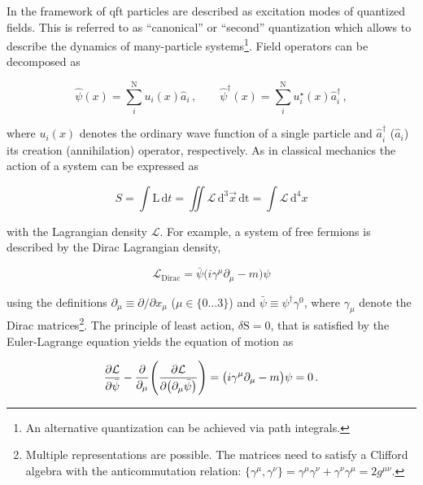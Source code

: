 In the framework of \gls{qft} particles are described as excitation modes of quantized fields. This is referred to as ``canonical'' or ``second'' quantization which allows to describe the dynamics of many-particle systems\footnote{An alternative quantization can be achieved via path integrals.}. Field operators can be decomposed as

\begin{equation}
\hat{\psi}(x)=\sum_{i}^{\mathrm{N}}u_{i}(x)\hat{a}_{i}\,,\qquad\hat{\psi}^{\dagger}(x)=\sum_{i}^{\mathrm{N}}u^{\star}_{i}(x)\hat{a}^{\dagger}_{i}\,,
\end{equation}

where $u_{i}(x)$ denotes the ordinary wave function of a single particle and $\hat{a}^{\dagger}_{i}$ ($\hat{a}_{i}$) its creation (annihilation) operator, respectively. As in classical mechanics the action of a system can be expressed as

\begin{equation}
S=\int\mathrm{L}\,\mathrm{d}t=\iint\mathcal{L}\,\mathrm{d}^{3}\vec{x}\,\mathrm{dt}=\int\mathcal{L}\,\mathrm{d}^{4}x
\end{equation}

with the Lagrangian density $\mathcal{L}$. For example, a system of free fermions is described by the Dirac Lagrangian density,

\begin{equation}
\label{eq:theory-diracL}
\mathcal{L}_\mathrm{Dirac}=\bar{\psi}\big(i\gamma^\mu\partial_\mu-m\big)\psi
\end{equation}

using the definitions $\partial_\mu\equiv\partial/\partial x_\mu$ ($\mu\in\{0\ldots3\}$) and $\bar{\psi}\equiv\psi^\dagger\gamma^{0}$, where $\gamma_\mu$ denote the Dirac matrices\footnote{Multiple representations are possible. The matrices need to satisfy a Clifford algebra with the anticommutation relation: $\big\{\gamma^\mu,\gamma^\nu\big\}=\gamma^\mu\gamma^\nu+\gamma^\nu\gamma^\mu=2g^{\mu\nu}$.}. The principle of least action, $\delta \mathrm{S}=0$, that is satisfied by the Euler-Lagrange equation yields the equation of motion as

\begin{equation}
\frac{\partial\mathcal{L}}{\partial\bar{\psi}}-\frac{\partial}{\partial_\mu}\Bigg(\frac{\partial\mathcal{L}}{\partial\big(\partial_\mu\bar{\psi}\big)}\Bigg)=\big(i\gamma^\mu\partial_\mu-m\big)\psi=0\,. \\
\end{equation}

